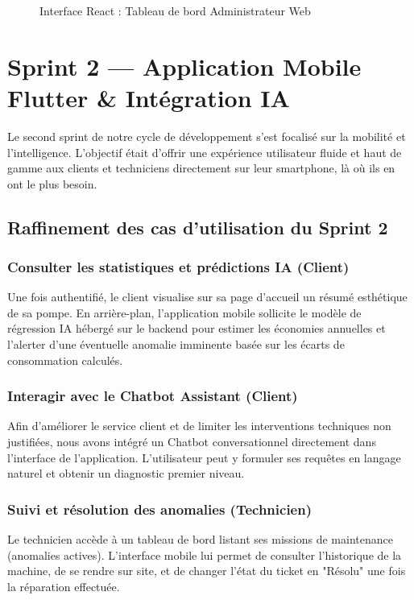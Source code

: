 \documentclass[12pt,a4paper]{report}
\begin{document}
\begin{figure}[H]
    \centering
    \vspace{4cm} %
    \caption{Interface React : Tableau de bord Administrateur Web}
    \label{fig:ui_admin}
\end{figure}


\section{Sprint 2 — Application Mobile Flutter \& Intégration IA}
Le second sprint de notre cycle de développement s'est focalisé sur la mobilité et l'intelligence. L'objectif était d'offrir une expérience utilisateur fluide et haut de gamme aux clients et techniciens directement sur leur smartphone, là où ils en ont le plus besoin.

\subsection{Raffinement des cas d'utilisation du Sprint 2}
\subsubsection{Consulter les statistiques et prédictions IA (Client)}
Une fois authentifié, le client visualise sur sa page d'accueil un résumé esthétique de sa pompe. En arrière-plan, l'application mobile sollicite le modèle de régression IA hébergé sur le backend pour estimer les économies annuelles et l'alerter d'une éventuelle anomalie imminente basée sur les écarts de consommation calculés.

\subsubsection{Interagir avec le Chatbot Assistant (Client)}
Afin d'améliorer le service client et de limiter les interventions techniques non justifiées, nous avons intégré un Chatbot conversationnel directement dans l'interface de l'application. L'utilisateur peut y formuler ses requêtes en langage naturel et obtenir un diagnostic premier niveau.

\subsubsection{Suivi et résolution des anomalies (Technicien)}
Le technicien accède à un tableau de bord listant ses missions de maintenance (anomalies actives). L'interface mobile lui permet de consulter l'historique de la machine, de se rendre sur site, et de changer l'état du ticket en "Résolu" une fois la réparation effectuée.
\end{document}
